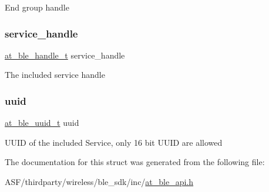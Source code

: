 End group handle \mbox{\label{structat__ble__included__service__t_a0c715587b85af2e83ed074e596f79f32}} 
\subsubsection{\texorpdfstring{service\_handle}{service\_handle}}
{\footnotesize\ttfamily \mbox{\hyperlink{at__ble__api_8h_abd23646d0c662860741f787efc8456f2}{at\+\_\+ble\+\_\+handle\+\_\+t}} service\+\_\+handle}

The included service handle \mbox{\label{structat__ble__included__service__t_a679a8e56540040619aee07eb7a743859}} 
\subsubsection{\texorpdfstring{uuid}{uuid}}
{\footnotesize\ttfamily \mbox{\hyperlink{structat__ble__uuid__t}{at\+\_\+ble\+\_\+uuid\+\_\+t}} uuid}

U\+U\+ID of the included Service, only 16 bit U\+U\+ID are allowed 

The documentation for this struct was generated from the following file\+:\begin{DoxyCompactItemize}
\item 
A\+S\+F/thirdparty/wireless/ble\+\_\+sdk/inc/\mbox{\hyperlink{at__ble__api_8h}{at\+\_\+ble\+\_\+api.\+h}}\end{DoxyCompactItemize}
